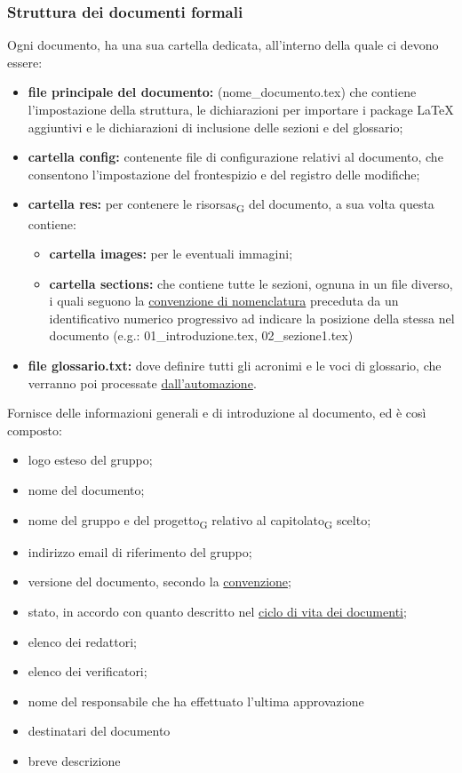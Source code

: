     \subsubsection{Struttura dei documenti formali}
    Ogni documento, ha una sua cartella dedicata, all'interno della quale ci devono essere:
    \begin{itemize}
        \item \textbf{file principale del documento: }(nome\_documento.tex) che contiene l'impostazione della struttura, le dichiarazioni per importare i package \LaTeX{} aggiuntivi e le dichiarazioni di inclusione delle sezioni e del glossario;
        \item \textbf{cartella config: }contenente file di configurazione relativi al documento, che consentono l'impostazione del frontespizio e del registro delle modifiche;
        \item \textbf{cartella res: }per contenere le \glspl{risorsa}\textsubscript{G} del documento, a sua volta questa contiene:
        \begin{itemize}
            \item \textbf{cartella images: }per le eventuali immagini;
            \item \textbf{cartella sections: }che contiene tutte le sezioni, ognuna in un file diverso, i quali seguono la \hyperref[convezionenomifile]{convenzione di nomenclatura} preceduta da un identificativo numerico progressivo ad indicare la posizione della stessa nel documento (e.g.: 01\_introduzione.tex, 02\_sezione1.tex)
        \end{itemize}
        \item \textbf{file glossario.txt: }dove definire tutti gli acronimi e le voci di glossario, che verranno poi processate \hyperref[glossario]{dall'automazione}.
    \end{itemize}
    Fornisce delle informazioni generali e di introduzione al documento, ed è così composto:
    \begin{itemize}
        \item logo esteso del gruppo;
        \item nome del documento;
        \item nome del gruppo e del \gls{progetto}\textsubscript{G} relativo al \gls{capitolato}\textsubscript{G} scelto;
        \item indirizzo email di riferimento del gruppo;
        \item versione del documento, secondo la \hyperref[versions]{convenzione};
        \item stato, in accordo con quanto descritto nel \hyperref[ciclovitadoc]{ciclo di vita dei documenti};
        \item elenco dei redattori;
        \item elenco dei verificatori;
        \item nome del responsabile che ha effettuato l'ultima approvazione
        \item destinatari del documento
        \item breve descrizione
    \end{itemize}

